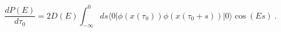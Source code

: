 \begin{equation}\label{l81-03}
\frac{dP(E)}{d\tau _0}=2D(E)\int _{-\infty}^{0}ds\langle 0|\phi(x(\tau _0))\phi(x(\tau _0+s))|0\rangle\cos(Es)~.
\end{equation}

